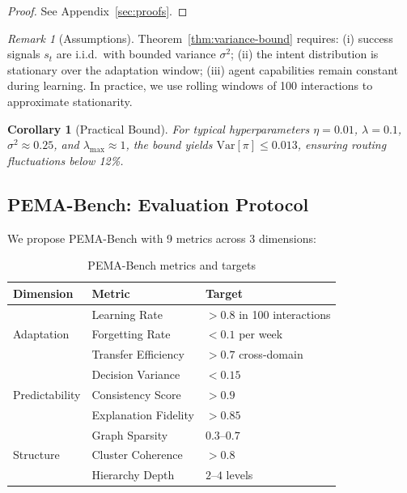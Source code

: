 \documentclass[11pt,a4paper]{article}
\newtheorem{corollary}[theorem]{Corollary}
\theoremstyle{definition}
\theoremstyle{remark}
\newtheorem{remark}{Remark}[section]
\begin{document}
\begin{proof}
See Appendix~\ref{sec:proofs}.
\end{proof}

\begin{remark}[Assumptions]
Theorem~\ref{thm:variance-bound} requires: (i) success signals $s_t$ are i.i.d.\ with bounded variance $\sigma^2$; (ii) the intent distribution is stationary over the adaptation window; (iii) agent capabilities remain constant during learning. In practice, we use rolling windows of 100 interactions to approximate stationarity.
\end{remark}

\begin{corollary}[Practical Bound]
For typical hyperparameters $\eta = 0.01$, $\lambda = 0.1$, $\sigma^2 \approx 0.25$, and $\lambda_{\max} \approx 1$, the bound yields $\text{Var}[\pi] \leq 0.013$, ensuring routing fluctuations below 12\%.
\end{corollary}

\subsection{PEMA-Bench: Evaluation Protocol}

We propose PEMA-Bench with 9 metrics across 3 dimensions:

\begin{table}[H]
\centering
\begin{tabular}{lll}
\toprule
\textbf{Dimension} & \textbf{Metric} & \textbf{Target} \\
\midrule
\multirow{3}{*}{Adaptation}
    & Learning Rate & $> 0.8$ in 100 interactions \\
    & Forgetting Rate & $< 0.1$ per week \\
    & Transfer Efficiency & $> 0.7$ cross-domain \\
\midrule
\multirow{3}{*}{Predictability}
    & Decision Variance & $< 0.15$ \\
    & Consistency Score & $> 0.9$ \\
    & Explanation Fidelity & $> 0.85$ \\
\midrule
\multirow{3}{*}{Structure}
    & Graph Sparsity & $0.3$--$0.7$ \\
    & Cluster Coherence & $> 0.8$ \\
    & Hierarchy Depth & $2$--$4$ levels \\
\bottomrule
\end{tabular}
\caption{PEMA-Bench metrics and targets}
\label{tab:pema-bench}
\end{table}
\end{document}
